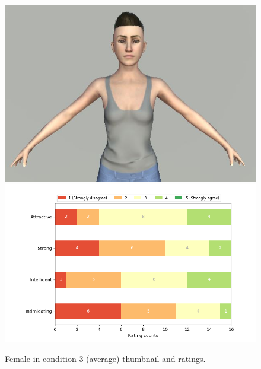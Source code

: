 \begin{figure}[H]
  \includegraphics[width=\linewidth]{Images/Females/18.JPG}
\endminipage\hfill
{}
  \includegraphics[width=\linewidth]{Survey/avatar_f_experiment3.png}
\endminipage\hfill
\caption{Female in condition 3 (average) thumbnail and ratings.}
\end{figure}

